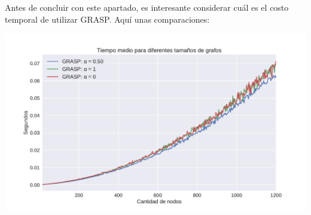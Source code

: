 Antes de concluir con este apartado, es interesante considerar cuál es el costo temporal de utilizar GRASP. Aquí unas comparaciones:

{\centering
    \includegraphics[width=1\textwidth]{informe/imgs/exp_malo_tiempo_grasp.pdf}
}
